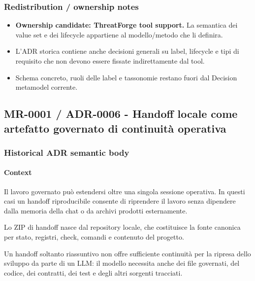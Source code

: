 \documentclass[
  10pt,
]{article}
\providecommand{\tightlist}{%
  \setlength{\itemsep}{0pt}\setlength{\parskip}{0pt}}
\begin{document}
\subsubsection{Redistribution / ownership
notes}\label{redistribution-ownership-notes-3}

\begin{itemize}
\tightlist
\item
  \textbf{Ownership candidate: ThreatForge tool support.} La semantica
  dei value set e dei lifecycle appartiene al modello/metodo che li
  definira.
\item
  L'ADR storica contiene anche decisioni generali su label, lifecycle e
  tipi di requisito che non devono essere fissate indirettamente dal
  tool.
\item
  Schema concreto, ruoli delle label e tassonomie restano fuori dal
  Decision metamodel corrente.
\end{itemize}

\subsection{MR-0001 / ADR-0006 - Handoff locale come artefatto governato
di continuità
operativa}\label{mr-0001-adr-0006---handoff-locale-come-artefatto-governato-di-continuituxe0-operativa}

\subsubsection{Historical ADR semantic
body}\label{historical-adr-semantic-body-4}

\paragraph{Context}\label{context-8}

Il lavoro governato può estendersi oltre una singola sessione operativa.
In questi casi un handoff riproducibile consente di riprendere il lavoro
senza dipendere dalla memoria della chat o da archivi prodotti
esternamente.

Lo ZIP di handoff nasce dal repository locale, che costituisce la fonte
canonica per stato, registri, check, comandi e contenuto del progetto.

Un handoff soltanto riassuntivo non offre sufficiente continuità per la
ripresa dello sviluppo da parte di un LLM: il modello necessita anche
dei file governati, del codice, dei contratti, dei test e degli altri
sorgenti tracciati.
\end{document}
